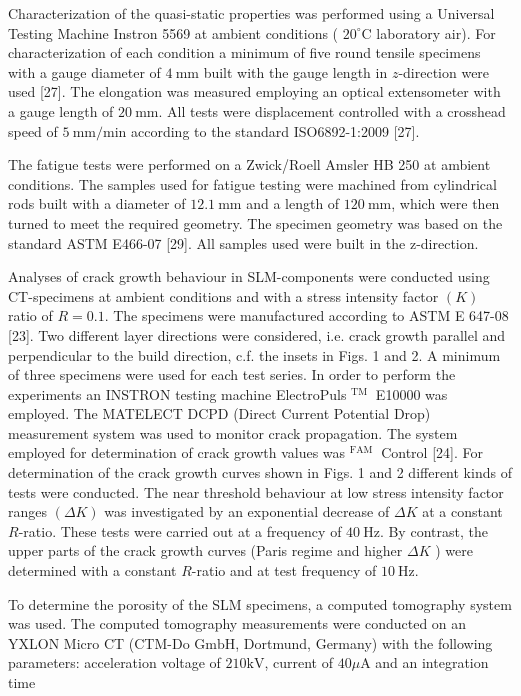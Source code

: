\documentclass[10pt]{article}
\begin{document}
Characterization of the quasi-static properties was performed using a Universal Testing Machine Instron 5569 at ambient conditions ( $20^{\circ} \mathrm{C}$ laboratory air). For characterization of each condition a minimum of five round tensile specimens with a gauge diameter of $4 \mathrm{~mm}$ built with the gauge length in $z$-direction were used [27]. The elongation was measured employing an optical extensometer with a gauge length of $20 \mathrm{~mm}$. All tests were displacement controlled with a crosshead speed of $5 \mathrm{~mm} / \mathrm{min}$ according to the standard ISO6892-1:2009 [27].

The fatigue tests were performed on a Zwick/Roell Amsler HB 250 at ambient conditions. The samples used for fatigue testing were machined from cylindrical rods built with a diameter of $12.1 \mathrm{~mm}$ and a length of $120 \mathrm{~mm}$, which were then turned to meet the required geometry. The specimen geometry was based on the standard ASTM E466-07 [29]. All samples used were built in the z-direction.

Analyses of crack growth behaviour in SLM-components were conducted using CT-specimens at ambient conditions and with a stress intensity factor $(K)$ ratio of $R=0.1$. The specimens were manufactured according to ASTM E 647-08 [23]. Two different layer directions were considered, i.e. crack growth parallel and perpendicular to the build direction, c.f. the insets in Figs. 1 and 2. A minimum of three specimens were used for each test series. In order to perform the experiments an INSTRON testing machine ElectroPuls ${ }^{\text {TM }}$ E10000 was employed. The MATELECT DCPD (Direct Current Potential Drop) measurement system was used to monitor crack propagation. The system employed for determination of crack growth values was ${ }^{\text {FAM }}$ Control [24]. For determination of the crack growth curves shown in Figs. 1 and 2 different kinds of tests were conducted. The near threshold behaviour at low stress intensity factor ranges $(\Delta K)$ was investigated by an exponential decrease of $\Delta K$ at a constant $R$-ratio. These tests were carried out at a frequency of $40 \mathrm{~Hz}$. By contrast, the upper parts of the crack growth curves (Paris regime and higher $\Delta K$ ) were determined with a constant $R$-ratio and at test frequency of $10 \mathrm{~Hz}$.

To determine the porosity of the SLM specimens, a computed tomography system was used. The computed tomography measurements were conducted on an YXLON Micro CT (CTM-Do $\mathrm{GmbH}$, Dortmund, Germany) with the following parameters: acceleration voltage of $210 \mathrm{kV}$, current of $40 \mu \mathrm{A}$ and an integration time
\end{document}
